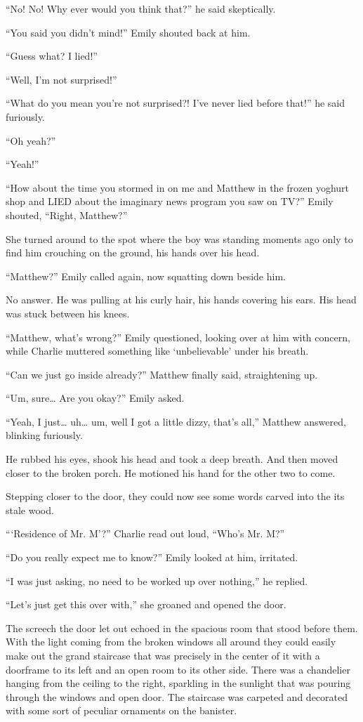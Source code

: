 “No! No! Why ever would you think that?” he said skeptically.

“You said you didn’t mind!” Emily shouted back at him.

“Guess what? I lied!”

“Well, I’m not surprised!”

“What do you mean you’re not surprised?! I’ve never lied before that!” he said furiously.

“Oh yeah?”

“Yeah!”

“How about the time you stormed in on me and Matthew in the frozen yoghurt shop and LIED about the imaginary news program you saw on TV?” Emily shouted, “Right, Matthew?”

She turned around to the spot where the boy was standing moments ago only to find him crouching on the ground, his hands over his head.

“Matthew?” Emily called again, now squatting down beside him.

No answer. He was pulling at his curly hair, his hands covering his ears. His head was stuck between his knees.

“Matthew, what’s wrong?” Emily questioned, looking over at him with concern, while Charlie muttered something like ‘unbelievable’ under his breath.

“Can we just go inside already?” Matthew finally said, straightening up.

“Um, sure… Are you okay?” Emily asked.

“Yeah, I just… uh… um, well I got a little dizzy, that’s all,” Matthew answered, blinking furiously.

He rubbed his eyes, shook his head and took a deep breath. And then moved closer to the broken porch. He motioned his hand for the other two to come.

Stepping closer to the door, they could now see some words carved into the its stale wood.

“‘Residence of Mr. M’?” Charlie read out loud, “Who’s Mr. M?”

“Do you really expect me to know?” Emily looked at him, irritated.

“I was just asking, no need to be worked up over nothing,” he replied.

“Let’s just get this over with,” she groaned and opened the door.

The screech the door let out echoed in the spacious room that stood before them. With the light coming from the broken windows all around they could easily make out the grand staircase that was precisely in the center of it with a doorframe to its left and an open room to its other side. There was a chandelier hanging from the ceiling to the right, sparkling in the sunlight that was pouring through the windows and open door. The staircase was carpeted and decorated with some sort of peculiar ornaments on the banister.

